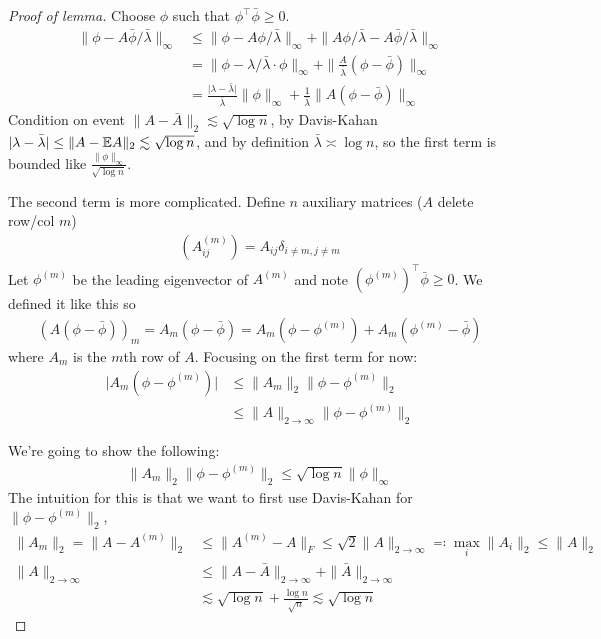 \begin{proof}[Proof of lemma]
  Choose $\phi$ such that $\phi^\top \bar\phi \geq 0$.
  \begin{align}
    \|\phi - A \bar\phi / \bar\lambda\|_\infty
    &\leq \|\phi - A \phi / \bar\lambda\|_\infty
    + \|A \phi/\bar\lambda - A \bar\phi / \bar\lambda\|_\infty \\
    &= \|\phi - \lambda / \bar\lambda \cdot \phi\|_\infty
    + \|\frac{A}{\bar\lambda}(\phi - \bar\phi)\|_\infty \\
    &= \frac{\lvert \lambda - \bar\lambda \rvert}{\bar \lambda} \|\phi\|_\infty
    + \frac{1}{\bar\lambda} \|A(\phi - \bar\phi)\|_\infty
  \end{align}
  Condition on event $\|A - \bar{A}\|_2 \lesssim \sqrt{\log n}$,
  by Davis-Kahan $\lvert \lambda - \bar\lambda \rvert \leq \|A - \mathbb{E} A\|_2 \lesssim \sqrt{\log n}$,
  and by definition $\bar\lambda \asymp \log n$, so the first term is bounded like
  $\frac{\|\phi\|_\infty}{\sqrt{\log n}}$.

  The second term is more complicated. Define $n$ auxiliary matrices
  ($A$ delete row/col $m$)
  \begin{align}
    (A^{(m)}_{ij}) = A_{ij} \delta_{i \neq m, j \neq m}
  \end{align}
  Let $\phi^{(m)}$ be the leading eigenvector of $A^{(m)}$ and note
  $(\phi^{(m)})^\top \bar\phi \geq 0$. We defined it like this so
  \begin{align}
    (A (\phi - \bar\phi))_m
    = A_m(\phi - \bar\phi)
    = A_m (\phi - \phi^{(m)}) + A_m(\phi^{(m)} - \bar\phi)
  \end{align}
  where $A_m$ is the $m$th row of $A$.
  Focusing on the first term for now:
  \begin{align}
    \lvert A_m (\phi - \phi^{(m)}) \rvert
    &\leq \|A_m\|_2 \|\phi - \phi^{(m)}\|_2 \\ &\leq \|A\|_{2 \to \infty} \|\phi - \phi^{(m)}\|_2
  \end{align}

  We're going to show the following:
  \begin{align}
    \|A_m\|_2 \|\phi - \phi^{(m)}\|_2 \leq \sqrt{\log n} \|\phi\|_\infty
  \end{align}
  The intuition for this is that we want to first use Davis-Kahan for
  $\|\phi - \phi^{(m)}\|_2$,
  \begin{align}
    \|A_m\|_2
    = \|A - A^{(m)}\|_2
    &\leq \|A^{(m)} - A\|_F
    \leq \sqrt{2} \|A\|_{2 \to \infty}
    \eqqcolon \max_i \|A_i\|_2  \leq \|A\|_2 \\
    \|A\|_{2 \to \infty}
    &\leq \|A - \bar{A}\|_{2 \to \infty} + \|\bar{A}\|_{2 \to \infty} \\
    &\lesssim \sqrt{\log n} + \frac{\log n}{\sqrt{n}}
    \lesssim \sqrt{\log n}
  \end{align}


\end{proof}
